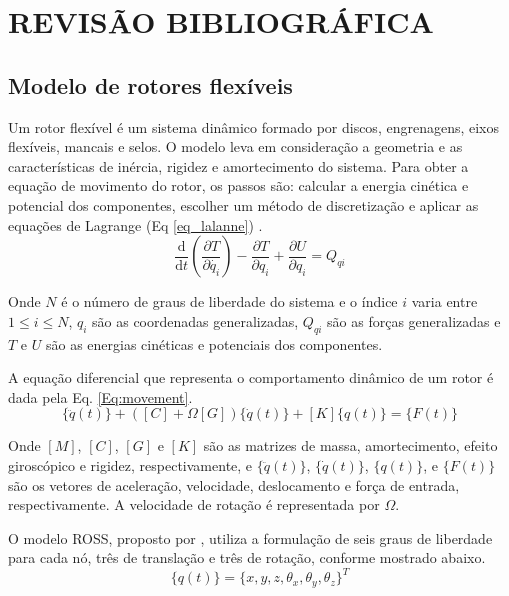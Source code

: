 \documentclass[10pt,fleqn,a4paper,twoside]{article}
\begin{document}
	\section{REVISÃO BIBLIOGRÁFICA}
	
	\subsection{Modelo de rotores flexíveis}
	
	Um rotor flexível é um sistema dinâmico formado por discos, engrenagens, eixos flexíveis, mancais e selos. O modelo leva em consideração a geometria e as características de inércia, rigidez e amortecimento do sistema. Para obter a equação de movimento do rotor, os passos são: calcular a energia cinética e potencial dos componentes, escolher um método de discretização e aplicar as equações de Lagrange (Eq \ref{eq_lalanne}) \citep{Lalanne1998}.
	\begin{equation}
		\frac{\mathrm{d} }{\mathrm{d} t}\left ( \frac{\partial T}{\partial \dot{q_i}} \right )-\frac{\partial T}{\partial q_i} + \frac{\partial U}{\partial q_i}=Q_{qi}
		\label{eq_lalanne}
	\end{equation}
	
	Onde $N$ é o número de graus de liberdade do sistema e o índice $i$ varia entre $1 \leq i \leq N$, $q_{i}$ são as coordenadas generalizadas, $Q_{qi}$ são as forças generalizadas e $T$ e $U$ são as energias cinéticas e potenciais dos componentes.
	
	A equação diferencial que representa o comportamento dinâmico de um rotor é dada pela Eq. \ref{Eq:movement}.
	\begin{equation}
		[M]\{\ddot{q}(t)\}+([C]+\Omega [G])\{\dot{q}(t)\}+[K]\{q(t)\}=\{F(t)\}
		\label{Eq:movement}
	\end{equation}
	
	Onde $[M]$, $[C]$, $[G]$ e $[K]$ são as matrizes de massa, amortecimento, efeito giroscópico e rigidez, respectivamente, e $\{\ddot{q}(t)\}$, $\{\dot{q}(t)\}$, $\{q(t)\}$, e $\{F(t)\}$ são os vetores de aceleração, velocidade, deslocamento e força de entrada, respectivamente. A velocidade de rotação é representada por $\Omega$.
	
	O modelo ROSS, proposto por \citet{ross}, utiliza a formulação de seis graus de liberdade para cada nó, três de translação e três de rotação, conforme mostrado abaixo.
	\begin{equation}
		\{q(t)\} = \{x,y,z, \theta_x, \theta_y, \theta_z\}^{T}
		\label{Eq:dof}
	\end{equation}
	
\end{document}
